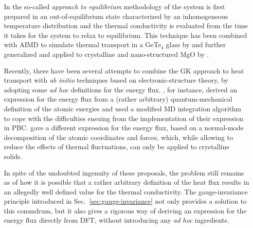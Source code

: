 In the so-called \emph{approach to equilibrium} methodology of \cite{Lampin2013} the system is first prepared in an out-of-equilibrium state characterized by an inhomogeneous temperature distribution and the thermal conductivity is evaluated from the time it takes for the system to relax to equilibrium. This technique has been combined with AIMD to simulate thermal transport in a GeTe$_4$ glass by \cite{Bouzid2017} and further generalized and applied to crystalline and nano-structured MgO by \cite{Puligheddu2017}.

Recently, there have been several attempts to combine the GK approach to heat transport with \emph{ab initio} techniques based on electronic-structure theory, by adopting some \emph{ad hoc} definitions for the energy flux. \cite{Kang2017}, for instance, derived an expression for the energy flux from a (rather arbitrary) quantum-mechanical definition of the atomic energies and used a modified MD integration algorithm to cope with the difficulties ensuing from the implementation of their expression in PBC. \cite{Carbogno:2017gc} gave a different expression for the energy flux, based on a normal-mode decomposition of the atomic coordinates and forces, which, while allowing to reduce the effects of thermal fluctuations, can only be applied to crystalline solids.

In spite of the undoubted ingenuity of these proposals, the problem still remains as of how it is possible that a rather arbitrary definition of the heat flux results in an allegedly well defined value for the thermal conductivity. The gauge-invariance principle introduced in Sec.~\ref{sec:gauge-invariance} not only provides a solution to this conundrum, but it also gives a rigorous way of deriving an expression for the energy flux directly from DFT, without introducing any \emph{ad hoc} ingredients.

